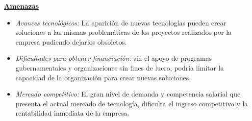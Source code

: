 \documentclass[a4paper,12pt]{article}
\begin{document}
    \textbf{\underline{Amenazas}}
    \begin{itemize}
        \item[] \textit{Avances tecnológicos:} La aparición de nuevas tecnologías pueden crear soluciones a las mismas problemáticas de los proyectos realizados por la empresa pudiendo dejarlos obsoletos.
        \item[] \textit{Dificultades para obtener financiación:} sin el apoyo de programas gubernamentales y organizaciones sin fines de lucro, podría limitar la capacidad de la organización para crear nuevas soluciones.
        \item[] \textit{Mercado competitivo:} El gran nivel de demanda y competencia salarial que presenta el actual mercado de tecnología, dificulta el ingreso competitivo y la rentabilidad inmediata de la empresa.
    \end{itemize}
\end{document}
